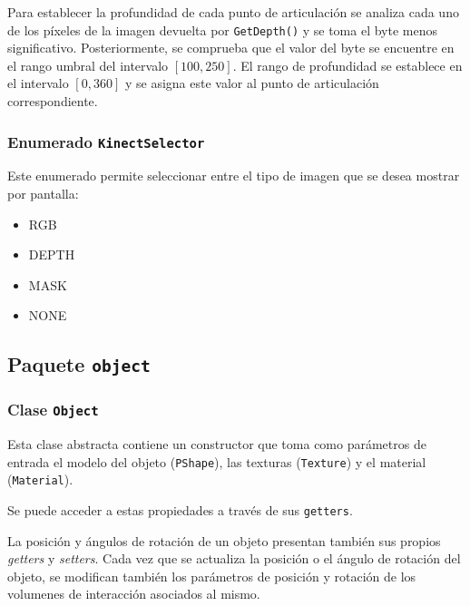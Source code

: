 \documentclass[10pt,a4paper]{report}
\begin{document}
	Para establecer la profundidad de cada punto de articulación se analiza cada uno de los píxeles de la imagen devuelta por \texttt{GetDepth()} y se toma el byte menos significativo. Posteriormente, se comprueba que el valor del byte se encuentre en el rango umbral del intervalo $\left[ 100, 250\right]$. El rango de profundidad se establece en el intervalo $\left[ 0, 360\right]$ y se asigna este valor al punto de articulación correspondiente.
	
	
	
	
	\subsubsection{Enumerado \texttt{KinectSelector}}
	Este enumerado permite seleccionar entre el tipo de imagen que se desea mostrar por pantalla:
	\begin{itemize}
	\item RGB
	\item DEPTH
	\item MASK
	\item NONE
	\end{itemize}
	
	
	
	
	\subsection{Paquete \texttt{object}}
	\subsubsection{Clase \texttt{Object}}
	Esta clase abstracta contiene un constructor que toma como parámetros de entrada el modelo del objeto (\texttt{PShape}), las texturas (\texttt{Texture}) y el material (\texttt{Material}).
	
	
	
	Se puede acceder a estas propiedades a través de sus \texttt{getters}.
	
	
	
	La posición y ángulos de rotación de un objeto presentan también sus propios \textit{getters} y \textit{setters}. Cada vez que se actualiza la posición o el ángulo de rotación del objeto, se modifican también los parámetros de posición y rotación de los volumenes de interacción asociados al mismo.
	
\end{document}
